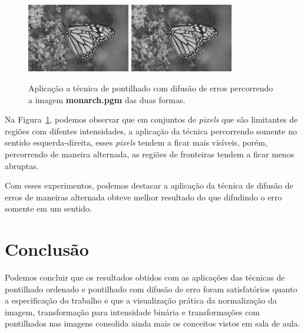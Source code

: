 \documentclass[twoside,twocolumn]{article}
\begin{document}
\begin{figure}[H]
\begin{center}
	\includegraphics[height=3cm]{figures/monarch_floyd_order1.png}
	\includegraphics[height=3cm]{figures/monarch_floyd_order2.png}
\caption{Aplicação a técnica de pontilhado com difusão de erros percorrendo a imagem \textbf{monarch.pgm} das duas formas.} \label{monarchfloyd}
\end{center}
\end{figure}

Na Figura~\ref{monarchfloyd}, podemos observar que em conjuntos de \textit{pixels} que são limitantes de regiões com difentes intensidades, a aplicação da técnica percorrendo somente no sentido esquerda-direita, esses \textit{pixels} tendem a ficar mais visíveis, porém, percorrendo de maneira alternada, as regiões de fronteiras tendem a ficar menos abruptas.

Com esses experimentos, podemos destacar a aplicação da técnica de difusão de erros de maneiras alternada obteve melhor resultado do que difudindo o erro somente em um sentido.


\section{Conclusão}

Podemos concluir que os resultados obtidos com as aplicações das técnicas de pontilhado ordenado e pontilhado com difusão de erro foram satisfatórios quanto a especificação do trabalho e que a visualização prática da normalização da imagem, transformação para intensidade binária e transformações com pontilhados nas imagens consolida ainda mais os conceitos vistos em sala de aula.

\end{document}
